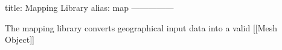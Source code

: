 title: Mapping Library
alias: map
---------------

The mapping library converts geographical input data into a valid [[Mesh Object]]
